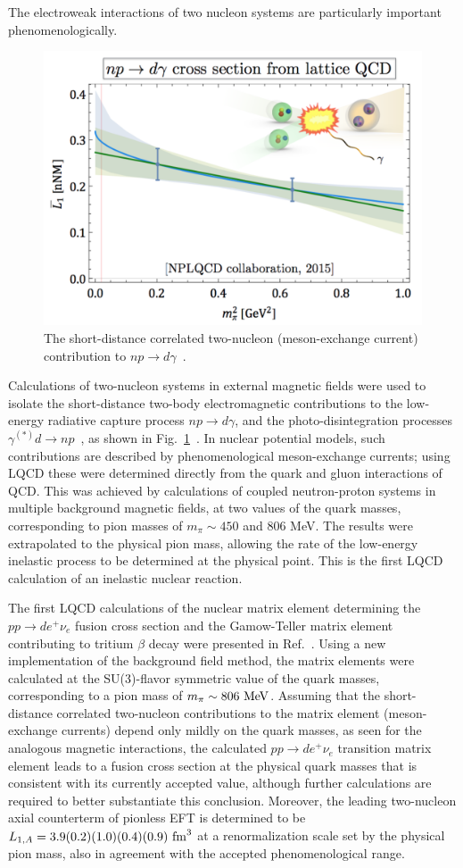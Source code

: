 The electroweak interactions of two nucleon systems are particularly important phenomenologically. 
\begin{figure}
	\centering
	\includegraphics[width=0.48\columnwidth]{figures/npTOdgamma.png}  
	\caption{ 
		The short-distance correlated two-nucleon (meson-exchange current)
		contribution to $np\rightarrow d\gamma$~\protect\cite{Beane:2015yha}.    
	}
	\label{fig:L1bar}
	\vspace*{-0.4cm}
\end{figure}
%
Calculations of two-nucleon systems in external magnetic fields were used to isolate the
short-distance two-body electromagnetic contributions to the low-energy radiative capture process $np\rightarrow d\gamma$,
and the photo-disintegration processes $\gamma^{(*)}d\rightarrow np$~\cite{Beane:2015yha},
as shown in Fig.~\ref{fig:L1bar}~\cite{Beane:2015yha,Detmold:2015daa}.  
In nuclear potential models, such contributions are described by 
phenomenological meson-exchange currents; using LQCD these were determined directly from the quark and gluon interactions of QCD.
This was achieved by calculations of coupled neutron-proton systems in multiple background magnetic fields, at two values of the 
quark masses, corresponding to pion masses of $m_\pi\sim 450$ and 806 MeV. The results were extrapolated to the physical pion mass, allowing the rate of the low-energy inelastic process to be determined 
at the physical point. 
This is the first LQCD calculation of an inelastic nuclear reaction.



The first LQCD calculations of the nuclear matrix element determining the $pp\rightarrow d e^+\nu_e$ fusion cross section and the Gamow-Teller matrix element contributing to tritium $\beta$ decay were presented in Ref.~\cite{Savage:2016kon}.
Using a new implementation of the background field method,
the matrix elements were calculated at the SU(3)-flavor symmetric 
value of the quark masses, corresponding to a pion mass of $m_\pi\sim 806~{\rm MeV}$. Assuming that the short-distance correlated two-nucleon contributions to the matrix element 
(meson-exchange currents) depend only mildly on the quark masses, as seen for the analogous magnetic interactions, 
the calculated $pp\rightarrow d e^+\nu_e$ transition matrix element leads to a fusion cross section at the physical quark 
masses that is consistent with its currently accepted value, although further calculations are required to  better substantiate this conclusion. Moreover, the leading two-nucleon axial counterterm of pionless EFT is determined to 
be $L_{1,A} = 3.9(0.2)(1.0)(0.4)(0.9)~{\rm fm}^3$ at a renormalization scale set by the physical pion mass, 
also in agreement with the accepted phenomenological range. 



